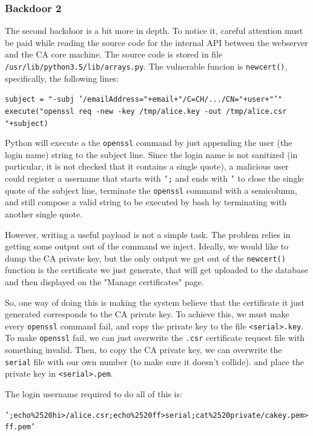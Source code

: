 \documentclass[english]{article}
\begin{document}
{\subsubsection*{Backdoor 2}
The second backdoor is a bit more in depth. To notice it, careful attention must be paid while reading the source code for the internal
API between the webserver and the CA core machine. The source code is stored in file \texttt{/usr/lib/python3.5/lib/arrays.py}.
The vulnerable funcion is \texttt{newcert()}, specifically, the following lines:

\noindent
\texttt{subject = "-subj '/emailAddress="+email+"/C=CH/.../CN="+user+"'" \\
execute("openssl req -new -key /tmp/alice.key -out /tmp/alice.csr "+subject)
}

Python will execute a the \texttt{openssl} command by just appending the user
(the login name) string to the subject line.  Since the login name is not
sanitized (in particular, it is not checked that it contains a single quote), a
malicious user could register a username that starts with \texttt{';} and ends
with \texttt{'} to close the single quote of the subject line, terminate the
\texttt{openssl} command with a semicolumn, and still compose a valid string to
be executed by bash by terminating with another single quote.

However, writing a useful payload is not a simple task. The problem relies in
getting some output out of the command we inject.  Ideally, we would like to
dump the CA private key, but the only output we get out of the
\texttt{newcert()} function is the certificate we just generate, that will get
uploaded to the database and then displayed on the "Manage certificates" page.

So, one way of doing this is making the system believe that the certificate it
just generated corresponds to the CA private key.  To achieve this, we must
make every \texttt{openssl} command fail, and copy the private key to the file
\texttt{<serial>.key}.  To make \texttt{openssl} fail, we can just overwrite
the \texttt{.csr} certificate request file with something invalid.  Then, to
copy the CA private key, we can overwrite the \texttt{serial} file with our own
number (to make sure it doesn't collide).  and place the private key in
\texttt{<serial>.pem}.

The login username required to do all of this is:

\noindent
\texttt{';echo\%2520hi>/alice.csr;echo\%2520ff>serial;cat\%2520private/cakey.pem>ff.pem'}

}
\end{document}
